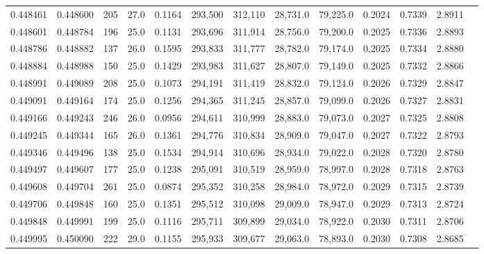 \begin{tabular}{rrrrrrrrrrrrr}
0.448461 & 0.448600 &   205 & 27.0 &                                     0.1164 & 293,500 & 312,110 &  28,731.0 &  79,225.0 & 0.2024 & 0.7339 & 2.8911 \\
0.448601 & 0.448784 &   196 & 25.0 &                                     0.1131 & 293,696 & 311,914 &  28,756.0 &  79,200.0 & 0.2025 & 0.7336 & 2.8893 \\
0.448786 & 0.448882 &   137 & 26.0 &                                     0.1595 & 293,833 & 311,777 &  28,782.0 &  79,174.0 & 0.2025 & 0.7334 & 2.8880 \\
0.448884 & 0.448988 &   150 & 25.0 &                                     0.1429 & 293,983 & 311,627 &  28,807.0 &  79,149.0 & 0.2025 & 0.7332 & 2.8866 \\
0.448991 & 0.449089 &   208 & 25.0 &                                     0.1073 & 294,191 & 311,419 &  28,832.0 &  79,124.0 & 0.2026 & 0.7329 & 2.8847 \\
0.449091 & 0.449164 &   174 & 25.0 &                                     0.1256 & 294,365 & 311,245 &  28,857.0 &  79,099.0 & 0.2026 & 0.7327 & 2.8831 \\
0.449166 & 0.449243 &   246 & 26.0 &                                     0.0956 & 294,611 & 310,999 &  28,883.0 &  79,073.0 & 0.2027 & 0.7325 & 2.8808 \\
0.449245 & 0.449344 &   165 & 26.0 &                                     0.1361 & 294,776 & 310,834 &  28,909.0 &  79,047.0 & 0.2027 & 0.7322 & 2.8793 \\
0.449346 & 0.449496 &   138 & 25.0 &                                     0.1534 & 294,914 & 310,696 &  28,934.0 &  79,022.0 & 0.2028 & 0.7320 & 2.8780 \\
0.449497 & 0.449607 &   177 & 25.0 &                                     0.1238 & 295,091 & 310,519 &  28,959.0 &  78,997.0 & 0.2028 & 0.7318 & 2.8763 \\
0.449608 & 0.449704 &   261 & 25.0 &                                     0.0874 & 295,352 & 310,258 &  28,984.0 &  78,972.0 & 0.2029 & 0.7315 & 2.8739 \\
0.449706 & 0.449848 &   160 & 25.0 &                                     0.1351 & 295,512 & 310,098 &  29,009.0 &  78,947.0 & 0.2029 & 0.7313 & 2.8724 \\
0.449848 & 0.449991 &   199 & 25.0 &                                     0.1116 & 295,711 & 309,899 &  29,034.0 &  78,922.0 & 0.2030 & 0.7311 & 2.8706 \\
0.449995 & 0.450090 &   222 & 29.0 &                                     0.1155 & 295,933 & 309,677 &  29,063.0 &  78,893.0 & 0.2030 & 0.7308 & 2.8685 \\

\end{tabular}
